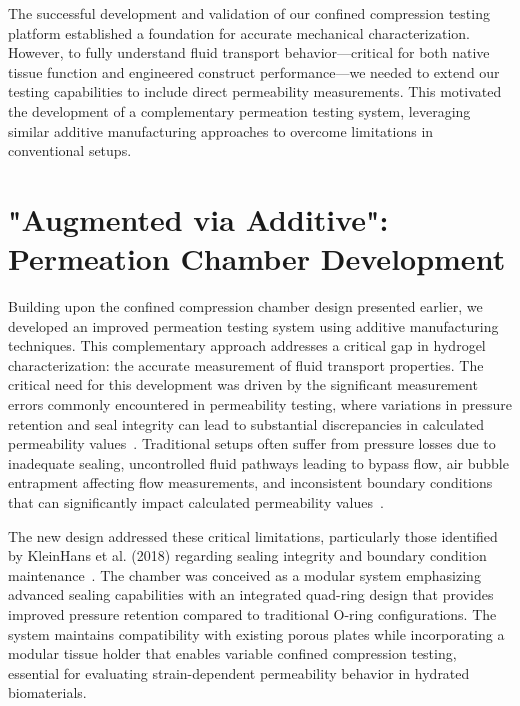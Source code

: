 The successful development and validation of our confined compression testing platform established a foundation for accurate mechanical characterization. However, to fully understand fluid transport behavior—critical for both native tissue function and engineered construct performance—we needed to extend our testing capabilities to include direct permeability measurements. This motivated the development of a complementary permeation testing system, leveraging similar additive manufacturing approaches to overcome limitations in conventional setups.

\clearpage
\section{"Augmented via Additive":\protect\\Permeation Chamber Development}

Building upon the confined compression chamber design presented earlier, we developed an improved permeation testing system using additive manufacturing techniques. This complementary approach addresses a critical gap in hydrogel characterization: the accurate measurement of fluid transport properties. The critical need for this development was driven by the significant measurement errors commonly encountered in permeability testing, where variations in pressure retention and seal integrity can lead to substantial discrepancies in calculated permeability values~\cite{kleinhans2018hydraulicpermeability}. Traditional setups often suffer from pressure losses due to inadequate sealing, uncontrolled fluid pathways leading to bypass flow, air bubble entrapment affecting flow measurements, and inconsistent boundary conditions that can significantly impact calculated permeability values~\cite{boschetti2004biomechanicalproperties}.

The new design addressed these critical limitations, particularly those identified by KleinHans et al. (2018) regarding sealing integrity and boundary condition maintenance~\cite{kleinhans2018hydraulicpermeability}. The chamber was conceived as a modular system emphasizing advanced sealing capabilities with an integrated quad-ring design that provides improved pressure retention compared to traditional O-ring configurations. The system maintains compatibility with existing porous plates while incorporating a modular tissue holder that enables variable confined compression testing, essential for evaluating strain-dependent permeability behavior in hydrated biomaterials.

